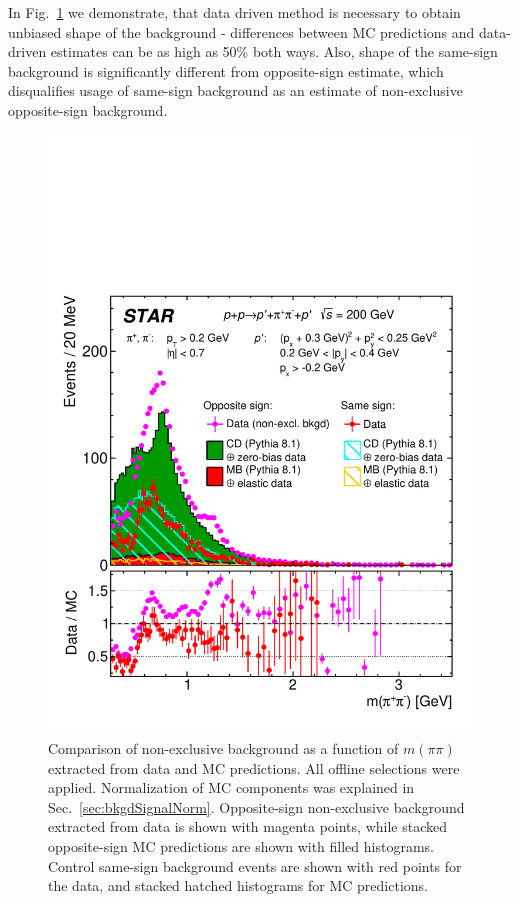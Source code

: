 In Fig.~\ref{fig:Ratio_InvMass} we demonstrate, that data driven method is necessary to obtain unbiased shape of the background - differences between MC predictions and data-driven estimates can be as high as 50\% both ways. Also, shape of the same-sign background is significantly different from opposite-sign estimate, which disqualifies usage of same-sign background as an estimate of non-exclusive opposite-sign background.


\begin{figure}[ht!]
\centering%
\parbox{0.5725\textwidth}{%
  \centering%
  \includegraphics[width=\linewidth]{graphics/backgrounds/dataVsMc/Ratio_InvMass.pdf} 
}%
\quad%
\parbox{0.3725\textwidth}{%
    \caption[Comparison of non-exclusive background as a function of $m(\pi\pi)$ extracted from data and MC predictions.]{Comparison of non-exclusive background as a function of $m(\pi\pi)$ extracted from data and MC predictions. All offline selections were applied. Normalization of MC components was explained in Sec.~\ref{sec:bkgdSignalNorm}. Opposite-sign non-exclusive background extracted from data is shown with magenta points, while stacked opposite-sign MC predictions are shown with filled histograms. Control same-sign background events are shown with red points for the data, and stacked hatched histograms for MC predictions.}\label{fig:Ratio_InvMass} %
}
\end{figure}







